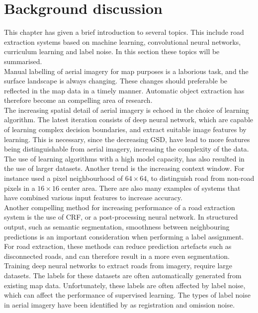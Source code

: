 \section{Background discussion}
\label{sec:backgroundDiscussion}
This chapter has given a brief introduction to several topics. This include road extraction systems based on machine learning, convolutional neural networks, curriculum learning and label noise. In this section these topics will be summarised. \\

Manual labelling of aerial imagery for map purposes is a laborious task, and the surface landscape is always changing. These changes should preferable be reflected in the map data in a timely manner. Automatic object extraction has therefore become an compelling area of research.\\

The increasing spatial detail of aerial imagery is echoed in the choice of learning algorithm. The latest iteration consists of deep neural network, which are capable of learning complex decision boundaries, and extract suitable image features by learning. This is necessary, since the decreasing \ac{GSD}, have lead to more features being distinguishable from aerial imagery, increasing the complexity of the data. The use of learning algorithms with a high model capacity, has also resulted in the use of larger datasets. Another trend is the increasing context window. For instance \cite{Mnih_roads_high_res_aerial_images} used a pixel neighbourhood of $64 \times 64$, to distinguish road from non-road pixels in a $16 \times 16$   center area. There are also many examples of systems that have combined various input features to increase accuracy.\\

Another compelling method for increasing performance of a road extraction system is the use of \ac{CRF}, or a post-processing neural network. In structured output, such as semantic segmentation,  smoothness between neighbouring predictions is an important consideration when performing a label assignment. For road extraction, these methods can reduce prediction artefacts such as disconnected roads, and can therefore result in a more even segmentation.\\

Training deep neural networks to extract roads from imagery, require large datasets. The labels for these datasets are often automatically generated from existing map data. Unfortunately, these labels are often affected by label noise, which can affect the performance of supervised learning. The types of label noise in aerial imagery have been identified by \cite{Mnih_aerial_images_noisy} as registration and omission noise.  \\

